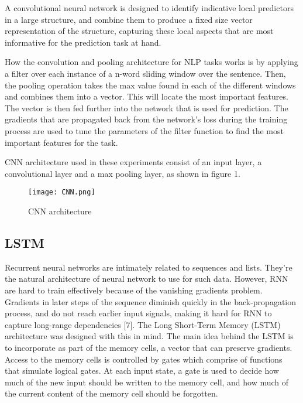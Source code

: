 \documentclass[twocolumn,12pt]{asme2ej}
\begin{document}
A convolutional neural network is designed to identify indicative local predictors in a large structure, and combine them to produce a fixed size vector representation of the structure, capturing these local aspects that are most informative for the prediction task at hand. \cite{PrimerNeuralNetworkModelsforNaturalLanguageProcessin} 

How the convolution and pooling architecture for NLP tasks works is by applying a filter over each instance of a n-word sliding window over the sentence. Then, the pooling operation takes the max value found in each of the different windows and combines them into a vector. This will locate the most important features. The vector is then fed further into the network that is used for prediction. The gradients that are propagated back from the network’s loss during the training process are used to tune the parameters of the filter function to find the most important features for the task.

CNN architecture used in these experiments consist of an input layer, a convolutional layer and a max pooling layer, as shown in figure 1.

\begin{figure}[h]
    \centering
    \texttt{[image: CNN.png]}
    \caption{CNN architecture}
    \label{fig:my_label}
\end{figure}


\subsection{LSTM}

Recurrent neural networks are intimately related to sequences and lists. They’re the natural architecture of neural network to use for such data. However, RNN are hard to train effectively because of the vanishing gradients problem. Gradients in later steps of the sequence diminish quickly in the back-propagation process, and do not reach earlier input signals, making it hard for RNN to capture long-range dependencies [7]. The Long Short-Term Memory (LSTM) architecture was designed with this in mind. The main idea behind the LSTM is to incorporate as part of the memory cells, a vector that can preserve gradients. Access to the memory cells is controlled by gates which comprise of functions that simulate logical gates. At each input state, a gate is used to decide how much of the new input should be written to the memory cell, and how much of the current content of the memory cell should be forgotten. 
\end{document}
